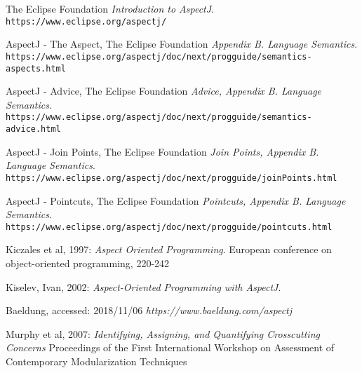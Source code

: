 \documentclass[sigconf]{acmart}
\begin{document}
\begin{thebibliography}{9}
The Eclipse Foundation
\textit{Introduction to AspectJ}. 
\\\texttt{https://www.eclipse.org/aspectj/}

AspectJ - The Aspect, The Eclipse Foundation
\textit{Appendix B. Language Semantics}. 
\\\texttt{https://www.eclipse.org/aspectj/doc/next/progguide/semantics-aspects.html}


AspectJ - Advice, The Eclipse Foundation
\textit{Advice, Appendix B. Language Semantics}. 
\\\texttt{https://www.eclipse.org/aspectj/doc/next/progguide/semantics-advice.html}

AspectJ - Join Points, The Eclipse Foundation
\textit{Join Points, Appendix B. Language Semantics}. 
\\\texttt{https://www.eclipse.org/aspectj/doc/next/progguide/joinPoints.html}

AspectJ - Pointcuts, The Eclipse Foundation
\textit{Pointcuts, Appendix B. Language Semantics}. 
\\\texttt{https://www.eclipse.org/aspectj/doc/next/progguide/pointcuts.html}

Kiczales et al, 1997: 
\textit{Aspect Oriented Programming}. 
European conference on object-oriented programming, 220-242

Kiselev, Ivan, 2002: 
\textit{Aspect-Oriented Programming with AspectJ}. 

Baeldung, accessed: 2018/11/06
\textit{https://www.baeldung.com/aspectj}

Murphy et al, 2007: 
\textit{Identifying, Assigning, and Quantifying Crosscutting Concerns}
Proceedings of the First International Workshop on Assessment of Contemporary Modularization Techniques
\end{thebibliography}
\end{document}

